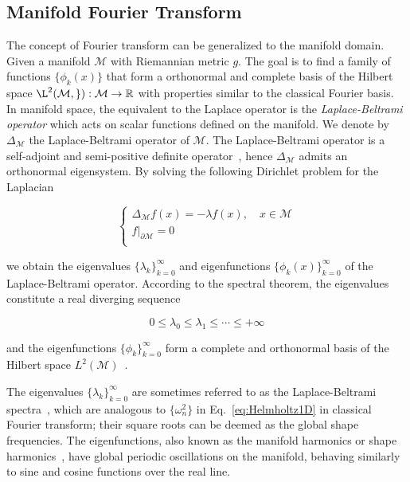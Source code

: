 \subsection{Manifold Fourier Transform}
The concept of Fourier transform can be generalized to the manifold domain.
Given a manifold $\mathcal{M}$ with Riemannian metric $g$. The goal is to find a
family of functions $\{\phi_k(x)\}$ that form a orthonormal and complete
basis of the Hilbert space $\L^2(\mathcal{M,g}):\mathcal{M}\to\mathbb{R}$ with
properties similar to the classical Fourier basis. In manifold space, the equivalent
to the Laplace operator is the \emph{Laplace-Beltrami operator} which acts on
scalar functions defined on the manifold. We denote by $\Delta_\mathcal{M}$ the
Laplace-Beltrami operator of $\mathcal{M}$. The Laplace-Beltrami operator is a self-adjoint
and semi-positive definite operator~\cite{Rosenberg:1997}, hence $\Delta_\mathcal{M}$ admits
an orthonormal eigensystem. By solving the following Dirichlet problem for the Laplacian

\begin{equation}
\left\{
    \begin{array}{l}
        \Delta_\mathcal{M}f(x)=-\lambda f(x),\quad x\in\mathcal{M}\\
        f|_{\partial\mathcal{M}}=0\\
    \end{array}
\right.
\end{equation}

we obtain the eigenvalues $\{\lambda_k\}_{k=0}^\infty$ and eigenfunctions $\{\phi_k(x)\}_{k=0}^\infty$
of the Laplace-Beltrami operator. According to the spectral theorem, the eigenvalues constitute a real
diverging sequence

\begin{equation*}
0\leq\lambda_0\leq\lambda_1\leq\cdots\leq +\infty
\end{equation*}

and the eigenfunctions $\{\phi_k\}_{k=0}^\infty$ form a complete and orthonormal basis of the Hilbert
space $L^2(\mathcal{M})$~\cite{Levy2006}.

The eigenvalues $\{\lambda_k\}_{k=0}^\infty$ are sometimes referred to as the Laplace-Beltrami
spectra~\cite{Reuter:2006:CAD}, which are analogous to $\{\omega_n^2\}$ in Eq.~\ref{eq:Helmholtz1D}
in classical Fourier transform; their square roots can be deemed as the global shape frequencies.
The eigenfunctions, also known as the manifold harmonics or shape harmonics~\cite{Vallet2008},
have global periodic oscillations on the manifold, behaving similarly to sine and cosine
functions over the real line.

